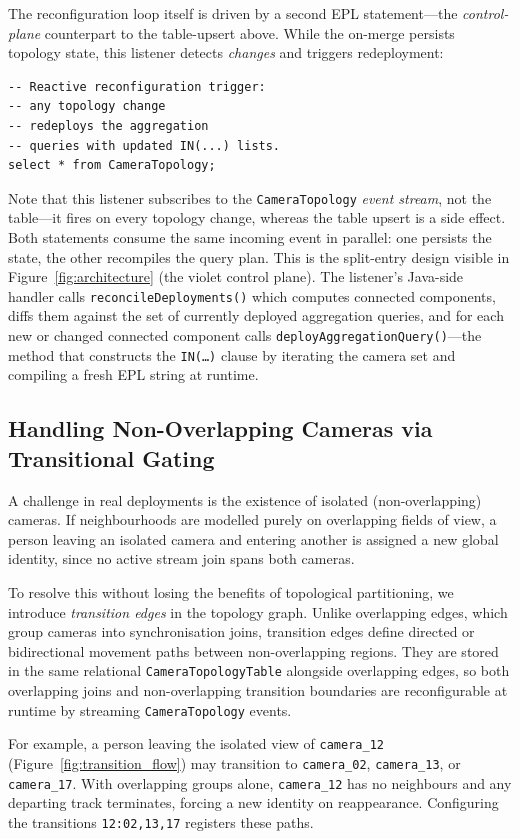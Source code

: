 \documentclass[5p,times]{elsarticle}
\begin{document}
The reconfiguration loop itself is driven by a second EPL statement---the \emph{control-plane} counterpart to the table-upsert above. While the on-merge persists topology state, this listener detects \emph{changes} and triggers redeployment:
{\small
\begin{verbatim}
-- Reactive reconfiguration trigger: 
-- any topology change
-- redeploys the aggregation 
-- queries with updated IN(...) lists.
select * from CameraTopology;
\end{verbatim}
}
Note that this listener subscribes to the \texttt{CameraTopology} \emph{event stream}, not the table---it fires on every topology change, whereas the table upsert is a side effect. Both statements consume the same incoming event in parallel: one persists the state, the other recompiles the query plan. This is the split-entry design visible in Figure~\ref{fig:architecture} (the violet control plane). The listener's Java-side handler calls \texttt{reconcileDeployments()} which computes connected components, diffs them against the set of currently deployed aggregation queries, and for each new or changed connected component calls \texttt{deployAggregationQuery()}---the method that constructs the \texttt{IN(\dots)} clause by iterating the camera set and compiling a fresh EPL string at runtime.


\subsection{Handling Non-Overlapping Cameras via Transitional Gating}
\label{sec:multi:transition}
A challenge in real deployments is the existence of isolated (non-overlapping) cameras. If neighbourhoods are modelled purely on overlapping fields of view, a person leaving an isolated camera and entering another is assigned a new global identity, since no active stream join spans both cameras.

To resolve this without losing the benefits of topological partitioning, we introduce \emph{transition edges} in the topology graph. Unlike overlapping edges, which group cameras into synchronisation joins, transition edges define directed or bidirectional movement paths between non-overlapping regions. They are stored in the same relational \texttt{CameraTopologyTable} alongside overlapping edges, so both overlapping joins and non-overlapping transition boundaries are reconfigurable at runtime by streaming \texttt{CameraTopology} events.

For example, a person leaving the isolated view of \texttt{camera\_12} (Figure~\ref{fig:transition_flow}) may transition to \texttt{camera\_02}, \texttt{camera\_13}, or \texttt{camera\_17}. With overlapping groups alone, \texttt{camera\_12} has no neighbours and any departing track terminates, forcing a new identity on reappearance. Configuring the transitions \texttt{12:02,13,17} registers these paths.
\end{document}
